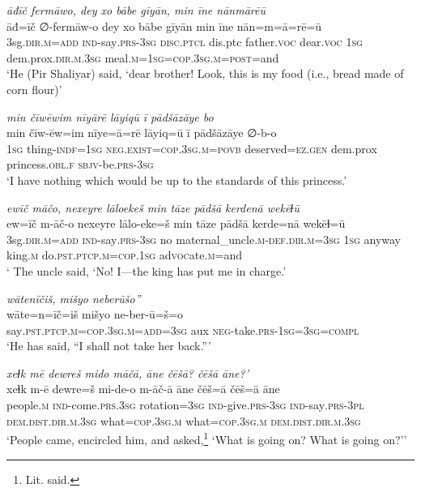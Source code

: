 \ea \label{ZP.101}
\textit{āđīč fermāwo, dey xo bābe gīyān, min īne nānmārēū} \\ 
\gll āđ=īč ∅-fermāw-o dey xo bābe gīyān min īne nān=m=ā=rē=ū \\ 
 3sg\textsc{.dir}\textsc{.m}\textsc{=add} \textsc{ind-}say\textsc{.prs}\textsc{-3sg} \textsc{disc.ptcl} dis.ptc father.\textsc{voc} dear.\textsc{voc} \textsc{1sg} dem.prox\textsc{.dir}\textsc{.m}\textsc{.3sg} meal\textsc{.m}\textsc{=\textsc{1sg}}\textsc{=cop}\textsc{.3sg}\textsc{.m}\textsc{=\textsc{post}}=and \\ 
\glt `He (Pir Shaliyar) said, ‘dear brother! Look, this is my food (i.e., bread made of corn flour)'
\z 
 
\ea \label{ZP.105}
\textit{min čīwēwim nīyārē lāyiqū ī pādšāzāye bo} \\ 
\gll min čīw-ēw=im nīye=ā=rē lāyiq=ū ī pādšāzāye ∅-b-o \\ 
 \textsc{1sg} thing\textsc{-indf}\textsc{=\textsc{1sg}} \textsc{\textsc{neg.}exist}\textsc{=cop}\textsc{.3sg}\textsc{.m}\textsc{=\textsc{povb}} deserved\textsc{\textsc{=ez.gen}} dem.prox princess\textsc{.obl}\textsc{.f} \textsc{sbjv-}be\textsc{.prs}\textsc{-3sg} \\ 
\glt `I have nothing which would be up to the standards of this princess.'
\z 
 
\ea \label{ZP.107}
\textit{ewīč māčo, nexeyre lāloekeš min tāze pādšā kerdenā wekēɫū} \\ 
\gll ew=īč m-āč-o nexeyre lālo-eke=š min tāze pādšā kerde=nā wekēɫ=ū \\ 
 3sg\textsc{.dir}\textsc{.m}\textsc{=add} \textsc{ind-}say\textsc{.prs}\textsc{-3sg} no maternal\_uncle\textsc{.m}\textsc{-def}\textsc{.dir}\textsc{.m}\textsc{=3sg} \textsc{1sg} anyway king\textsc{.m} do\textsc{.pst}\textsc{.ptcp}\textsc{.m}\textsc{=cop}\textsc{.\textsc{1sg}} ad\textsc{voc}ate\textsc{.m}=and \\ 
\glt ` The uncle said, ‘No! I—the king has put me in charge.'
\z 
 
\ea \label{ZP.108}
\textit{wātenīčiš, mišyo neberūšo”} \\ 
\gll wāte=n=īč=iš mišyo ne-ber-ū=š=o \\ 
 say\textsc{.pst}\textsc{.ptcp}\textsc{.m}\textsc{=cop}\textsc{.3sg}\textsc{.m}\textsc{=add}\textsc{=3sg} aux \textsc{neg-}take\textsc{.prs}\textsc{-\textsc{1sg}}\textsc{=3sg}\textsc{=compl} \\ 
\glt `He has said, “I shall not take her back.”'
\z 
 
\ea \label{ZP.113}
\textit{xeɫk mē dewreš mido māčā, āne čēšā? čēšā āne?’} \\ 
\gll xeɫk m-ē dewre=š mi-de-o m-āč-ā āne čēš=ā čēš=ā āne \\ 
 people\textsc{.m} \textsc{ind-}come\textsc{.prs}\textsc{.3sg} rotation\textsc{=3sg} \textsc{ind-}give\textsc{.prs}\textsc{-3sg} \textsc{ind-}say\textsc{.prs}\textsc{-3pl} \textsc{dem.dist}\textsc{.dir}\textsc{.m}\textsc{.3sg} what\textsc{=cop}\textsc{.3sg}\textsc{.m} what\textsc{=cop}\textsc{.3sg}\textsc{.m} \textsc{dem.dist}\textsc{.dir}\textsc{.m}\textsc{.3sg} \\ 
\glt `People came, encircled him, and asked,\footnote{Lit. said.} ‘What is going on? What is going on?’'
\z 
 
